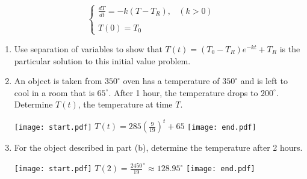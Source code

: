 \documentclass[12pt]{article}
\begin{document}
\begin{enumerate}
$$\left\{\begin{array}{ll}
\frac{dT}{dt}=-k(T-T_R), & (k >0)\\
&\\
T(0)=T_0 &
\end{array}\right.$$

\begin{enumerate}

\item Use separation of variables to show that $T(t)=(T_0-T_R)e^{-kt}+T_R$ is the particular solution to this initial value problem.

\item An object is taken from $350^{\circ}$ oven has a temperature of $350^{\circ}$ and is left to cool in a room that is $65^{\circ}$.  After 1 hour, the temperature drops to $200^{\circ}$.  Determine $T(t)$, the temperature at time $T$.

\texttt{[image: start.pdf]}
{{$T(t)=285\left(\frac{9}{19}\right)^t+65$}}
\texttt{[image: end.pdf]}


\item For the object described in part (b), determine the temperature after 2 hours.

\texttt{[image: start.pdf]}
{{$T(2)=\frac{2450}{19}^{\circ}\approx 128.95^{\circ}$}}
\texttt{[image: end.pdf]}


\end{enumerate}

\end{enumerate}
\end{document}
